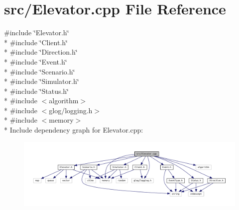 \section{src/\+Elevator.cpp File Reference}
\label{_elevator_8cpp}
{\ttfamily \#include \char`\"{}Elevator.\+h\char`\"{}}\\*
{\ttfamily \#include \char`\"{}Client.\+h\char`\"{}}\\*
{\ttfamily \#include \char`\"{}Direction.\+h\char`\"{}}\\*
{\ttfamily \#include \char`\"{}Event.\+h\char`\"{}}\\*
{\ttfamily \#include \char`\"{}Scenario.\+h\char`\"{}}\\*
{\ttfamily \#include \char`\"{}Simulator.\+h\char`\"{}}\\*
{\ttfamily \#include \char`\"{}Status.\+h\char`\"{}}\\*
{\ttfamily \#include $<$algorithm$>$}\\*
{\ttfamily \#include $<$glog/logging.\+h$>$}\\*
{\ttfamily \#include $<$memory$>$}\\*
Include dependency graph for Elevator.\+cpp\+:
\nopagebreak
\begin{figure}[H]
\begin{center}
\leavevmode
\includegraphics[width=350pt]{_elevator_8cpp__incl}
\end{center}
\end{figure}
